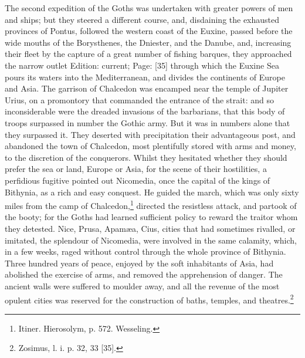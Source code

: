The second expedition of the Goths was undertaken with greater powers of men and ships; but they steered a different course, and, disdaining the exhausted provinces of Pontus, followed the western coast of the Euxine, passed before the wide mouths of the Borysthenes, the Dniester, and the Danube, and, increasing their fleet by the capture of a great number of fishing barques, they approached the narrow outlet Edition: current; Page: [35] through which the Euxine Sea pours its waters into the Mediterranean, and divides the continents of Europe and Asia. The garrison of Chalcedon was encamped near the temple of Jupiter Urius, on a promontory that commanded the entrance of the strait: and so inconsiderable were the dreaded invasions of the barbarians, that this body of troops surpassed in number the Gothic army. But it was in numbers alone that they surpassed it. They deserted with precipitation their advantageous post, and abandoned the town of Chalcedon, most plentifully stored with arms and money, to the discretion of the conquerors. Whilst they hesitated whether they should prefer the sea or land, Europe or Asia, for the scene of their hostilities, a perfidious fugitive pointed out Nicomedia, once the capital of the kings of Bithynia, as a rich and easy conquest. He guided the march, which was only sixty miles from the camp of Chalcedon,\footnote{Itiner. Hierosolym, p. 572. Wesseling.} directed the resistless attack, and partook of the booty; for the Goths had learned sufficient policy to reward the traitor whom they detested. Nice, Prusa, Apamæa, Cius, cities that had sometimes rivalled, or imitated, the splendour of Nicomedia, were involved in the same calamity, which, in a few weeks, raged without control through the whole province of Bithynia. Three hundred years of peace, enjoyed by the soft inhabitants of Asia, had abolished the exercise of arms, and removed the apprehension of danger. The ancient walls were suffered to moulder away, and all the revenue of the most opulent cities was reserved for the construction of baths, temples, and theatres.\footnote{Zosimus, l. i. p. 32, 33 [35].}

